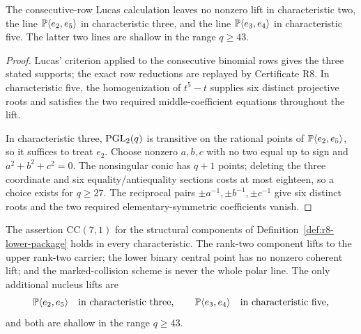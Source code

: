 \begin{proposition}\label{prop:r8-modular}%
%
The consecutive-row Lucas calculation leaves no nonzero lift in
characteristic two, the line $\mathbb P\langle e_2,e_5\rangle$ in
characteristic three, and the line
$\mathbb P\langle e_3,e_4\rangle$ in characteristic five.  The latter two
lines are shallow in the range $q\geq43$.
\end{proposition}

\begin{proof}
Lucas' criterion applied to the consecutive binomial rows gives the
three stated supports; the exact row reductions are replayed by
Certificate R8.  In characteristic five, the homogenization of
$t^5-t$ supplies six distinct projective roots and satisfies the two
required middle-coefficient equations throughout the lift.

In characteristic three, $\operatorname{PGL}_2(q)$ is transitive on the rational
points of $\mathbb P\langle e_2,e_5\rangle$, so it suffices to treat $e_2$.
Choose nonzero $a,b,c$ with no two equal up to sign and
$a^2+b^2+c^2=0$.  The nonsingular conic has $q+1$ points; deleting the
three coordinate and six equality/antiequality sections costs at most
eighteen, so a choice exists for $q\geq27$.  The reciprocal pairs
$\pm a^{-1},\pm b^{-1},\pm c^{-1}$ give six distinct roots and the two
required elementary-symmetric coefficients vanish.
\end{proof}

\begin{proposition}
\label{prop:r8-contained}%
%
The assertion $\mathrm{CC}(7,1)$ for the structural components of
Definition~\ref{def:r8-lower-package} holds in every characteristic.
The rank-two component lifts to the upper rank-two carrier; the lower
binary central point has no nonzero coherent lift; and the
marked-collision scheme is never the whole polar line.  The only
additional nucleus lifts are
\[
 \mathbb P\langle e_2,e_5\rangle\quad\text{in characteristic three},
 \qquad
 \mathbb P\langle e_3,e_4\rangle\quad\text{in characteristic five},
\]
and both are shallow in the range $q\geq43$.
\end{proposition}

